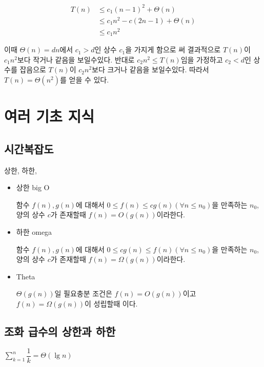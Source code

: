 \documentclass{oblivoir}
\begin{document}
\begin{align*}
    T(n) & \le c_1(n-1)^2 + \Theta(n) \\
    & \le c_1n^2 - c(2n-1) + \Theta(n) \\
    & \le c_1n^2    
\end{align*}


이때 $\Theta(n) = dn$에서 $ c_1 > d $인 상수 $c_1$을 가지게 함으로 써 결과적으로 $T(n)$이 $c_1n^2$보다 작거나 같음을 보일수있다. 반대로 $c_2n^2 \le T(n)$임을 가정하고  $ c_2 < d $인 상수를 잡음으로 $T(n)$이 $c_2n^2$보다 크거나 같음을 보일수있다. 따라서 $T(n) = \Theta(n^2)$를 얻을 수 있다.



\section{여러 기초 지식}

\subsection{시간복잡도}

\begin{dfn}[복잡도]
    상한, 하한,  
    \begin{itemize}

        \item 상한 big O
        
        함수 $f(n), g(n)$에 대해서 $0 \le f(n) \le cg(n) ( \forall n \leq n_0)$을 만족하는 $n_0$, 양의 상수 $c$가 존재할때 $f(n) = O(g(n))$이라한다.
        
        \item 하한 omega

        함수 $f(n), g(n)$에 대해서 $0 \le cg(n) \le f(n) ( \forall n \leq n_0)$을 만족하는 $n_0$, 양의 상수 $c$가 존재할때 $f(n) = \Omega(g(n))$이라한다.

        \item Theta

        $\Theta(g(n))$일 필요충분 조건은 $f(n) = O(g(n))$이고 $f(n) = \Omega(g(n))$이 성립할때 이다.
    \end{itemize}
\end{dfn}

\subsection{조화 급수의 상한과 하한}



$\sum_{k=1}^{n} \dfrac{1}{k} = \Theta(\lg n)$
\end{document}
